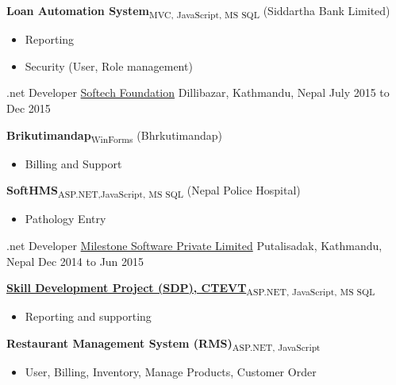 \begin{cventries}
{\begin{cvitems}
		\item {\textbf{Loan Automation System}\textsubscript{MVC, JavaScript, MS SQL} (Siddartha Bank Limited)}
		\begin{itemize}
			\item {Reporting}
			\item {Security (User, Role management)}
		\end{itemize}
	\end{cvitems}
}
  \cventry
    {.net Developer} %
    {\href{http://softechfoundation.com/}{Softech Foundation}} %
    {Dillibazar, Kathmandu, Nepal} %
    {July 2015 to Dec 2015} %
    {
    	\begin{cvitems} %
    		\item {\textbf{Brikutimandap}\textsubscript{WinForms} (Bhrkutimandap)}
    		\begin{itemize}
    			\item {Billing and Support}
    		\end{itemize}
    		\item {\textbf{SoftHMS}\textsubscript{ASP.NET,JavaScript, MS SQL} (Nepal Police Hospital)}
    		\begin{itemize}
    			\item {Pathology Entry}
    		\end{itemize}
    	\end{cvitems}
    }
 
  \cventry
    {.net Developer} %
    {\href{http://milestonesoftware.com.np/}{Milestone Software Private Limited}} %
    {Putalisadak, Kathmandu, Nepal} %
    {Dec 2014 to Jun 2015} %
    {
      \begin{cvitems} %
        \item \textbf{\href{http://202.45.144.216/}{Skill Development Project (SDP), CTEVT}}\textsubscript{ASP.NET, JavaScript, MS SQL}
        \begin{itemize}
        \item {Reporting and supporting}
        \end{itemize}
        \item \textbf{Restaurant Management System (RMS)}\textsubscript{ASP.NET, JavaScript}
        \begin{itemize}
        \item {User, Billing, Inventory, Manage Products, Customer Order}
        \end{itemize}
      \end{cvitems}
    }


\end{cventries}
